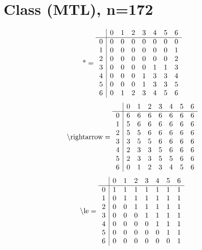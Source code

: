 \documentclass[11pt]{article}
\begin{document}
\section{Class (MTL), n=172}
\[\text{*} = 
\begin{array}{r | r r r r r r r}
 & 0 & 1 & 2 & 3 & 4 & 5 & 6 \\ \hline
0 & 0 & 0 & 0 & 0 & 0 & 0 & 0 \\
1 & 0 & 0 & 0 & 0 & 0 & 0 & 1 \\
2 & 0 & 0 & 0 & 0 & 0 & 0 & 2 \\
3 & 0 & 0 & 0 & 0 & 1 & 1 & 3 \\
4 & 0 & 0 & 0 & 1 & 3 & 3 & 4 \\
5 & 0 & 0 & 0 & 1 & 3 & 3 & 5 \\
6 & 0 & 1 & 2 & 3 & 4 & 5 & 6 \\
\end{array}
\]
\[\text{\textbackslash rightarrow} = 
\begin{array}{r | r r r r r r r}
 & 0 & 1 & 2 & 3 & 4 & 5 & 6 \\ \hline
0 & 6 & 6 & 6 & 6 & 6 & 6 & 6 \\
1 & 5 & 6 & 6 & 6 & 6 & 6 & 6 \\
2 & 5 & 5 & 6 & 6 & 6 & 6 & 6 \\
3 & 3 & 5 & 5 & 6 & 6 & 6 & 6 \\
4 & 2 & 3 & 3 & 5 & 6 & 6 & 6 \\
5 & 2 & 3 & 3 & 5 & 5 & 6 & 6 \\
6 & 0 & 1 & 2 & 3 & 4 & 5 & 6 \\
\end{array}
\]
\[\text{\textbackslash le} = 
\begin{array}{r | r r r r r r r}
 & 0 & 1 & 2 & 3 & 4 & 5 & 6 \\ \hline
0 & 1 & 1 & 1 & 1 & 1 & 1 & 1 \\
1 & 0 & 1 & 1 & 1 & 1 & 1 & 1 \\
2 & 0 & 0 & 1 & 1 & 1 & 1 & 1 \\
3 & 0 & 0 & 0 & 1 & 1 & 1 & 1 \\
4 & 0 & 0 & 0 & 0 & 1 & 1 & 1 \\
5 & 0 & 0 & 0 & 0 & 0 & 1 & 1 \\
6 & 0 & 0 & 0 & 0 & 0 & 0 & 1 \\
\end{array}
\]
\end{document}
